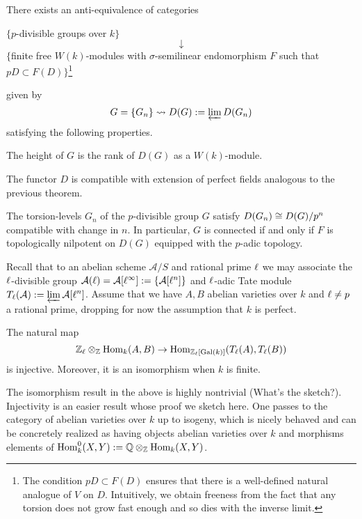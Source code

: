 \documentclass[11pt]{article}
\renewcommand{\A}{\mathcal{A}}
\newcommand{\func}{\rightsquigarrow}
\begin{document}
\begin{corollary}
There exists an anti-equivalence of categories 
\begin{center}
$\{p$-divisible groups over $k\}$
$$\downarrow$$
$\{$finite free $W(k)$-modules with $\sigma$-semilinear endomorphism $F$ such that $pD\subset F(D)\}$\footnote{The condition $pD\subset F(D)$ ensures that there is a well-defined natural analogue of $V$ on $D$. Intuitively, we obtain freeness from the fact that any torsion does not grow fast enough and so dies with the inverse limit.}
\end{center}
given by 
$$G=\{G_n\}\func D(G):=\flim D(G_n)$$
satisfying the following properties.
\begin{enum}{\alph}
\item The height of $G$ is the rank of $D(G)$ as a $W(k)$-module.

\item The functor $D$ is compatible with extension of perfect fields analogous to the previous theorem.

\item The torsion-levels $G_n$ of the $p$-divisible group $G$ satisfy $D(G_n)\cong D(G)/p^n$ compatible with change in $n$. In particular, $G$ is connected if and only if $F$ is topologically nilpotent on $D(G)$ equipped with the $p$-adic topology.
\end{enum}
\end{corollary}

Recall that to an abelian scheme $\A/S$ and rational prime $\ell$ we may associate the $\ell$-divisible group $\A(\l)=\A[\l^{\infty}]:=\{\A[\l^n]\}$ and $\ell$-adic Tate module $T_{\l}(\A):=\flim\A[\l^n]$. Assume that we have $A,B$ abelian varieties over $k$ and $\ell\neq p$ a rational prime, dropping for now the assumption that $k$ is perfect.

\begin{theorem}[Tate]
The natural map 
$$\mathbb{Z}_{\ell}\otimes_{\mathbb{Z}}\operatorname{Hom}_k(A,B)\to\operatorname{Hom}_{\mathbb{Z}_{\ell}[\operatorname{Gal}(k)]}(T_{\ell}(A),T_{\ell}(B))$$
is injective. Moreover, it is an isomorphism when $k$ is finite.
\end{theorem}

The isomorphism result in the above is highly nontrivial (What's the sketch?). Injectivity is an easier result whose proof we sketch here. One passes to the category of abelian varieties over $k$ up to isogeny, which is nicely behaved and can be concretely realized as having objects abelian varieties over $k$ and morphisms elements of $\operatorname{Hom}_k^0(X,Y):=\mathbb{Q}\otimes_{\mathbb{Z}}\operatorname{Hom}_k(X,Y)$. 
\end{document}
